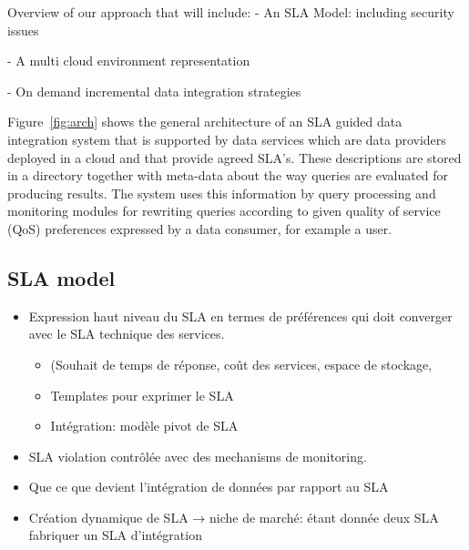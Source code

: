 {\color{green}
Overview of our approach that will include:
- An SLA Model: including security issues

- A multi cloud environment representation

- On demand incremental data integration strategies
}

\begin{figure*}
\caption{General architecture of an SLA guided  data integration system.\label{fig:arch}}
\end{figure*}

Figure~\ref{fig:arch} shows the general architecture of an SLA guided data integration system that is supported by data services which are data providers deployed in a cloud and that provide agreed SLA’s. 
These descriptions are stored in a directory together with meta-data about the way queries are evaluated for producing results. 
The system uses this information  by query processing and monitoring modules for rewriting queries according to given quality of service (QoS) preferences expressed by a data consumer, for example a user.

\subsection{SLA model}
\label{sec:slaModel}

\begin{itemize}
\item Expression haut niveau du SLA en termes de préférences qui doit converger avec le SLA technique des services.
  \begin{itemize}
  \item (Souhait de temps de réponse, coût des services, espace de stockage,  
  \item Templates pour exprimer le SLA
  \item Intégration: modèle pivot de SLA
\end{itemize}

\item SLA violation contrôlée avec des mechanisms de monitoring.
\item Que ce que devient l’intégration de données par rapport au SLA
\item Création dynamique de SLA → niche de marché: étant donnée deux SLA fabriquer un SLA d’intégration
\end{itemize}


